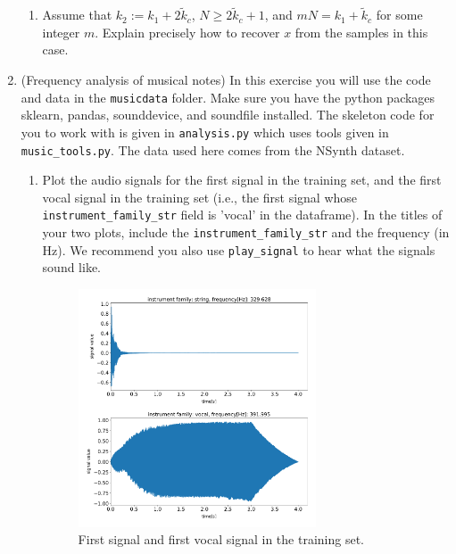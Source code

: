 \documentclass[12pt,twoside]{article}
\begin{document}
\begin{enumerate}
\begin{enumerate}
\item Assume that $k_2:=k_1 + 2\tilde{k}_c$, $N\geq 2\tilde{k}_c+1$,
  and $mN = k_1+\tilde{k}_c$ for some integer $m$. Explain precisely how to recover $x$ from the samples in this case.
\end{enumerate} 
 
 \newpage
 \item  (Frequency analysis of musical notes) In this exercise you will
  use the code and data in the \texttt{musicdata} folder.  Make sure you have
  the python packages sklearn, pandas, sounddevice, and soundfile
  installed.  The skeleton code for you to work with is given in
  \texttt{analysis.py} which uses tools given in
  \texttt{music\_tools.py}.  The data used here comes from the NSynth
  dataset.

  \begin{enumerate}
  \item Plot the audio signals for the first signal in the training
    set, and the first vocal signal in the training set (i.e., the
    first signal whose \texttt{instrument\_family\_str} field is
    'vocal' in the dataframe).  In the titles of your two plots, include the
    \texttt{instrument\_family\_str} and the frequency (in Hz).
    We recommend you also use \texttt{play\_signal}
    to hear what the signals sound like.
    
	\begin{figure}[H]
		\centering
		\captionsetup{justification=centering}
		\includegraphics[width=200pt]{code/musicdata/signals.pdf}
		\caption{First signal and first vocal signal in the training set.}
	\end{figure}


\end{enumerate}
\end{enumerate}
\end{document}
